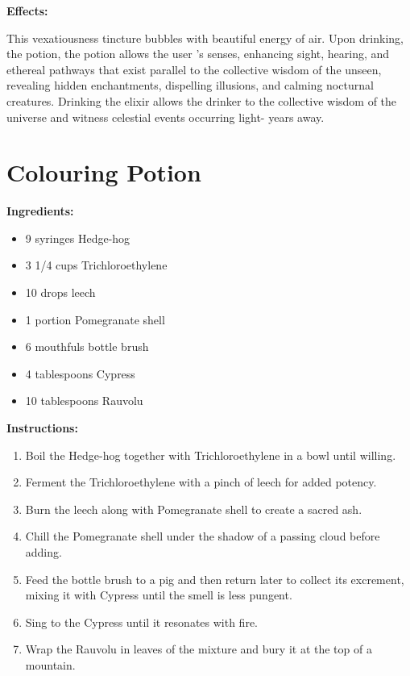 \documentclass{article}
\begin{document}
\textbf{Effects:}

This vexatiousness tincture bubbles with beautiful energy of air. Upon drinking, the potion, the potion allows the user 's senses, enhancing sight, hearing, and ethereal pathways that exist parallel to the collective wisdom of the unseen, revealing hidden enchantments, dispelling illusions, and calming nocturnal creatures. Drinking the elixir allows the drinker to the collective wisdom of the universe and witness celestial events occurring light- years away.

\newpage
\section*{Colouring Potion}

\textbf{Ingredients:}

\begin{itemize}
  \item 9 syringes Hedge-hog
  \item 3 1/4 cups Trichloroethylene
  \item 10 drops leech
  \item 1 portion Pomegranate shell
  \item 6 mouthfuls bottle brush
  \item 4 tablespoons Cypress
  \item 10 tablespoons Rauvolu
\end{itemize}

\textbf{Instructions:}

\begin{enumerate}
  \item Boil the Hedge-hog together with Trichloroethylene in a bowl until willing.
  \item Ferment the Trichloroethylene with a pinch of leech for added potency.
  \item Burn the leech along with Pomegranate shell to create a sacred ash.
  \item Chill the Pomegranate shell under the shadow of a passing cloud before adding.
  \item Feed the bottle brush to a pig and then return later to collect its excrement, mixing it with Cypress until the smell is less pungent.
  \item Sing to the Cypress until it resonates with fire.
  \item Wrap the Rauvolu in leaves of the mixture and bury it at the top of a mountain.
\end{enumerate}
\end{document}
